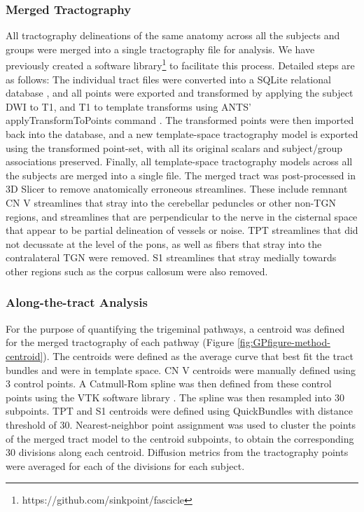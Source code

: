 \subsubsection{Merged Tractography}
All tractography delineations of the same anatomy across all the subjects and groups were merged into a single tractography file for analysis. We have previously created a software library\footnote{https://github.com/sinkpoint/fascicle} to facilitate this process. Detailed steps are as follows: The individual tract files were converted into a SQLite relational database \cite{owens2010sqlite}, and  all points were exported and transformed by applying the subject DWI to T1, and T1 to template transforms using ANTS' applyTransformToPoints command \cite{Avants2009}. The transformed points were then imported back into the  database, and a new template-space tractography model is exported using the transformed point-set, with all its original scalars and subject/group associations preserved. Finally, all template-space tractography models across all the subjects are merged into a single file. 
The merged tract was post-processed in 3D Slicer to remove anatomically erroneous streamlines. These include remnant CN V streamlines that stray into the cerebellar peduncles or other non-TGN regions, and streamlines that are perpendicular to the nerve in the cisternal space that appear to be partial delineation of vessels or noise. TPT streamlines that did not decussate at the level of the pons, as well as fibers that stray into the contralateral TGN were removed. S1 streamlines that stray medially towards other regions such as the corpus callosum were also removed.

\subsubsection{Along-the-tract Analysis}
For the purpose of quantifying the trigeminal pathways, a centroid was defined for the merged tractography of each pathway (Figure \ref{fig:GPfigure-method-centroid}). The centroids were defined as the average curve that best fit the tract bundles and were in template space. CN V centroids were manually defined using 3 control points. A Catmull-Rom spline \cite{DeRose1988} was then defined from these control points using the VTK software library \cite{Schroeder2005}. The spline was then resampled into 30 subpoints. TPT and S1 centroids were defined using QuickBundles \cite{Garyfallidis2012} with distance threshold of 30. Nearest-neighbor point assignment was used to cluster the points of the merged tract model to the centroid subpoints, to obtain the corresponding 30 divisions along each centroid. Diffusion metrics from the tractography points were averaged for each of the divisions for each subject. 

